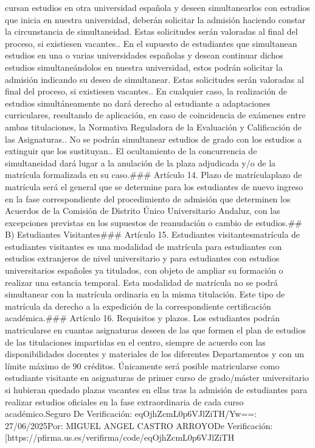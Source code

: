 \documentclass{article}
\begin{document}
\begin{itemize}
cursan estudios en otra universidad española y deseen simultanearlos con estudios que inicia en nuestra universidad, deberán solicitar la admisión haciendo constar la circunstancia de simultaneidad. Estas solicitudes serán valoradas al final del proceso, si existiesen vacantes.\n{}. En el supuesto de estudiantes que simultanean estudios en una o varias universidades españolas y desean continuar dichos estudios simultaneándolos en nuestra universidad, estos podrán solicitar la admisión indicando su deseo de simultanear. Estas solicitudes serán valoradas al final del proceso, si existiesen vacantes.\n{}. En cualquier caso, la realización de estudios simultáneamente no dará derecho al estudiante a adaptaciones curriculares, resultando de aplicación, en caso de coincidencia de exámenes entre ambas titulaciones, la Normativa Reguladora de la Evaluación y Calificación de las Asignaturas.\n{}. No se podrán simultanear estudios de grado con los estudios a extinguir que los sustituyan.\n{}. El ocultamiento de la concurrencia de simultaneidad dará lugar a la anulación de la plaza adjudicada y/o de la matrícula formalizada en su caso.\n\n### Artículo 14. Plazo de matrícula\n\nEl plazo de matrícula será el general que se determine para los estudiantes de nuevo ingreso en la fase correspondiente del procedimiento de admisión que determinen los Acuerdos de la Comisión de Distrito Único Universitario Andaluz, con las excepciones previstas en los supuestos de reanudación o cambio de estudios.\n\n## B) Estudiantes Visitantes\n\n### Artículo 15. Estudiantes visitantes\n\nLa matrícula de estudiantes visitantes es una modalidad de matrícula para estudiantes con estudios extranjeros de nivel universitario y para estudiantes con estudios universitarios españoles ya titulados, con objeto de ampliar su formación o realizar una estancia temporal. Esta modalidad de matrícula no se podrá simultanear con la matrícula ordinaria en la misma titulación. Este tipo de matrícula da derecho a la expedición de la correspondiente certificación académica.\n\n### Artículo 16. Requisitos y plazos\n{}. Los estudiantes podrán matricularse en cuantas asignaturas deseen de las que formen el plan de estudios de las titulaciones impartidas en el centro, siempre de acuerdo con las disponibilidades docentes y materiales de los diferentes Departamentos y con un límite máximo de 90 créditos. Únicamente será posible matricularse como estudiante visitante en asignaturas de primer curso de grado/máster universitario si hubieran quedado plazas vacantes en ellas tras la admisión de estudiantes para realizar estudios oficiales en la fase extraordinaria de cada curso académico.\n{} Seguro De Verificación: eqOjhZcmL0p6VJlZiTH/Yw==\nFecha: 27/06/2025\nFirmado Por: MIGUEL ANGEL CASTRO ARROYO\nUrl De Verificación: [https://pfirma.us.es/verifirma/code/eqOjhZcmL0p6VJlZiTH%
\end{itemize}
\end{document}
